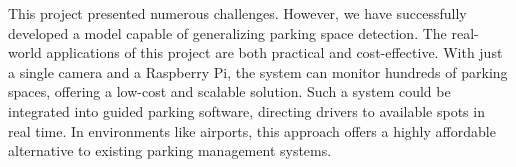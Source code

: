 \documentclass[12pt, letterpaper, oneside]{article}
\begin{document}
This project presented numerous challenges. However, we have successfully developed a model capable of generalizing parking space detection. The real-world applications of this project are both practical and cost-effective. With just a single camera and a Raspberry Pi, the system can monitor hundreds of parking spaces, offering a low-cost and scalable solution. Such a system could be integrated into guided parking software, directing drivers to available spots in real time. In environments like airports, this approach offers a highly affordable alternative to existing parking management systems.







\end{document}
